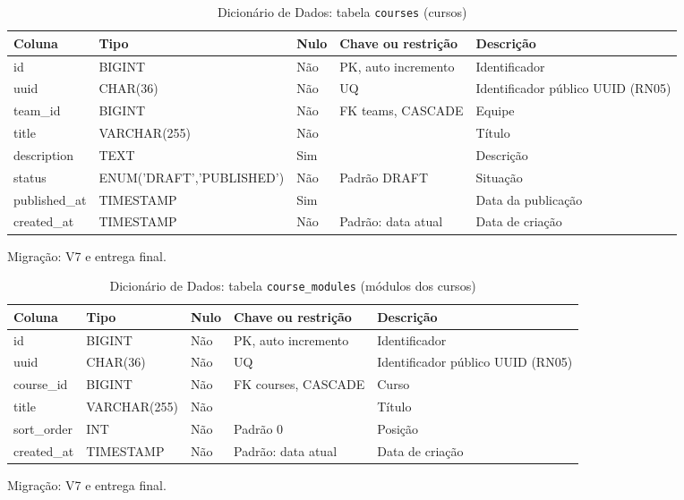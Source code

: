 \begin{table}[H]
\centering
\footnotesize
\caption{Dicionário de Dados: tabela \texttt{courses} (cursos)}
\label{tab:dd-courses}
\begin{tabular}{|>{\raggedright\arraybackslash}p{3.0cm}|>{\raggedright\arraybackslash}p{3.2cm}|>{\centering\arraybackslash}p{0.8cm}|>{\raggedright\arraybackslash}p{3.0cm}|>{\raggedright\arraybackslash}p{3.8cm}|}
\hline
\textbf{Coluna} & \textbf{Tipo} & \textbf{Nulo} & \textbf{Chave ou restrição} & \textbf{Descrição} \\
\hline
id & BIGINT & Não & PK, auto incremento & Identificador \\
\hline
uuid & CHAR(36) & Não & UQ & Identificador público UUID (RN05) \\
\hline
team\_\allowbreak{}id & BIGINT & Não & FK teams, CASCADE & Equipe \\
\hline
title & VARCHAR(255) & Não &  & Título \\
\hline
description & TEXT & Sim &  & Descrição \\
\hline
status & ENUM('DRAFT',\allowbreak 'PUBLISHED') & Não & Padrão DRAFT & Situação \\
\hline
published\_\allowbreak{}at & TIMESTAMP & Sim &  & Data da publicação \\
\hline
created\_\allowbreak{}at & TIMESTAMP & Não & Padrão: data atual & Data de criação \\
\hline
\end{tabular}
\par\footnotesize Migração: V7 e entrega final.
\end{table}

\begin{table}[H]
\centering
\footnotesize
\caption{Dicionário de Dados: tabela \texttt{course\_\allowbreak{}modules} (módulos dos cursos)}
\label{tab:dd-course-modules}
\begin{tabular}{|>{\raggedright\arraybackslash}p{3.0cm}|>{\raggedright\arraybackslash}p{3.2cm}|>{\centering\arraybackslash}p{0.8cm}|>{\raggedright\arraybackslash}p{3.0cm}|>{\raggedright\arraybackslash}p{3.8cm}|}
\hline
\textbf{Coluna} & \textbf{Tipo} & \textbf{Nulo} & \textbf{Chave ou restrição} & \textbf{Descrição} \\
\hline
id & BIGINT & Não & PK, auto incremento & Identificador \\
\hline
uuid & CHAR(36) & Não & UQ & Identificador público UUID (RN05) \\
\hline
course\_\allowbreak{}id & BIGINT & Não & FK courses, CASCADE & Curso \\
\hline
title & VARCHAR(255) & Não &  & Título \\
\hline
sort\_\allowbreak{}order & INT & Não & Padrão 0 & Posição \\
\hline
created\_\allowbreak{}at & TIMESTAMP & Não & Padrão: data atual & Data de criação \\
\hline
\end{tabular}
\par\footnotesize Migração: V7 e entrega final.
\end{table}

